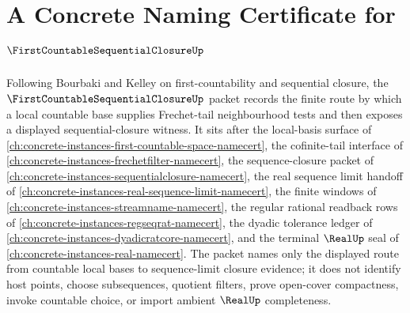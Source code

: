 \chapter{A Concrete Naming Certificate for $\FirstCountableSequentialClosureUp$}
\label{ch:concrete-instances-first-countable-sequential-closure-namecert}

Following Bourbaki and Kelley on first-countability and sequential closure, the $\FirstCountableSequentialClosureUp$ packet records the finite route by which a local countable base supplies Frechet-tail neighbourhood tests and then exposes a displayed sequential-closure witness. It sits after the local-basis surface of \autoref{ch:concrete-instances-first-countable-space-namecert}, the cofinite-tail interface of \autoref{ch:concrete-instances-frechetfilter-namecert}, the sequence-closure packet of \autoref{ch:concrete-instances-sequentialclosure-namecert}, the real sequence limit handoff of \autoref{ch:concrete-instances-real-sequence-limit-namecert}, the finite windows of \autoref{ch:concrete-instances-streamname-namecert}, the regular rational readback rows of \autoref{ch:concrete-instances-regseqrat-namecert}, the dyadic tolerance ledger of \autoref{ch:concrete-instances-dyadicratcore-namecert}, and the terminal $\RealUp$ seal of \autoref{ch:concrete-instances-real-namecert}. The packet names only the displayed route from countable local bases to sequence-limit closure evidence; it does not identify host points, choose subsequences, quotient filters, prove open-cover compactness, invoke countable choice, or import ambient $\RealUp$ completeness.

